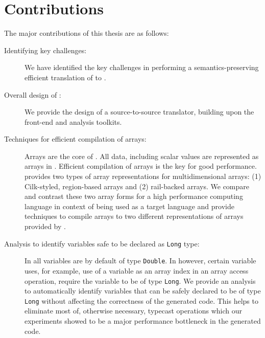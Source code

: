 
\section{Contributions}
  
The major contributions  of this thesis are as follows:

\begin{description}

\item[Identifying key challenges:] We have identified the key challenges
in performing a semantics-preserving efficient translation of \matlab to \xten.

\item[Overall design of \mixten:] We provide the design of a 
source-to-source translator, building upon the \mclab front-end and
analysis toolkits\cite{JesseThesis, TamerPaper}.

\item[Techniques for efficient compilation of \matlab arrays:] Arrays are 
the core of \matlab. All data, including scalar values are represented          
as arrays in \matlab. Efficient compilation of arrays is the key for            
good performance. \xten provides two          
types of array representations for multidimensional arrays: (1)                 
Cilk-styled, region-based arrays and (2) rail-backed arrays. We compare         
and contrast these two array forms for a high performance computing             
language in context of being used as a target language and provide techniques 
to compile \matlab arrays to two different representations of arrays provided 
by \xten.

\item[Analysis to identify variables safe to be declared as \texttt{Long} type:] 
In \matlab all variables are by default of type
\texttt{Double}. In \xten however, certain variable uses, for example, use of a
variable as an array index in an array access operation, require the variable to
be of type \texttt{Long}. We provide an analysis to automatically identify 
variables that can be safely declared to be of type \texttt{Long} without 
affecting the correctness of the generated \xten code. This helps to eliminate
most of, otherwise necessary, typecast operations which our experiments
showed to be a major performance bottleneck in the generated code.      


\end{description}
